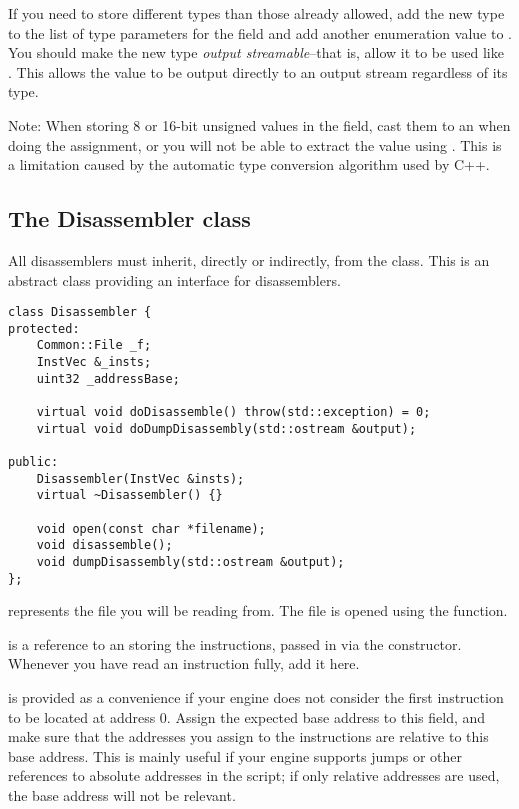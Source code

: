 If you need to store different types than those already allowed, add the new type to the list of type parameters for the  field and add another enumeration value to . You should make the new type \emph{output streamable}--that is, allow it to be used like . This allows the value to be output directly to an output stream regardless of its type.

Note: When storing 8 or 16-bit unsigned values in the  field, cast them to an  when doing the assignment, or you will not be able to extract the value using . This is a limitation caused by the automatic type conversion algorithm used by C++.

\subsection{The Disassembler class}
All disassemblers must inherit, directly or indirectly, from the  class. This is an abstract class providing an interface for disassemblers.

\begin{C++}
\begin{lstlisting}
class Disassembler {
protected:
	Common::File _f;
	InstVec &_insts;
	uint32 _addressBase;

	virtual void doDisassemble() throw(std::exception) = 0;
	virtual void doDumpDisassembly(std::ostream &output);

public:
	Disassembler(InstVec &insts);
	virtual ~Disassembler() {}

	void open(const char *filename);
	void disassemble();
	void dumpDisassembly(std::ostream &output);
};
\end{lstlisting}
\end{C++}

 represents the file you will be reading from. The file is opened using the  function.

 is a reference to an  storing the instructions, passed in via the constructor. Whenever you have read an instruction fully, add it here.

 is provided as a convenience if your engine does not consider the first instruction to be located at address 0. Assign the expected base address to this field, and make sure that the addresses you assign to the instructions are relative to this base address. This is mainly useful if your engine supports jumps or other references to absolute addresses in the script; if only relative addresses are used, the base address will not be relevant.

